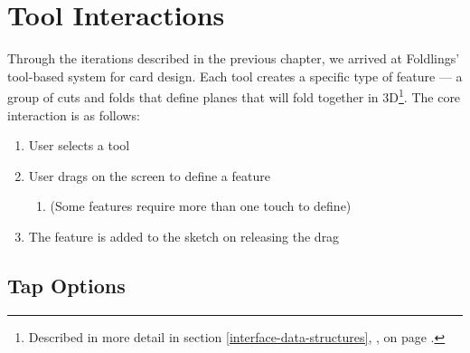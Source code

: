 \section{Tool Interactions}\label{tool-interactions}

Through the iterations described in the previous chapter, we arrived at
Foldlings' tool-based system for card design. Each tool creates a
specific type of feature --- a group of cuts and folds that define
planes that will fold together in 3D\footnote{Described in more detail
  in section \ref{interface-data-structures},
  , on page
  \pageref{interface-data-structures}.}. The core interaction is as
follows:

\begin{enumerate}
\def\labelenumi{\arabic{enumi}.}
\itemsep1pt\parskip0pt
\item
  User selects a tool
\item
  User drags on the screen to define a feature

  \begin{enumerate}
  \def\labelenumii{\alph{enumii}.}
  \itemsep1pt\parskip0pt
  \item
    (Some features require more than one touch to define)
  \end{enumerate}
\item
  The feature is added to the sketch on releasing the drag
\end{enumerate}

\subsection{Tap Options}\label{tap-options}

